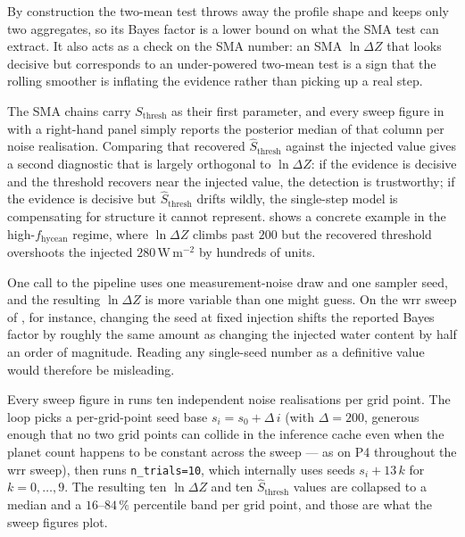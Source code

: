 By construction the two-mean test throws away the profile shape and
keeps only two aggregates, so its Bayes factor is a lower bound on
what the SMA test can extract.  It also acts as a check on the SMA
number: an SMA $\ln\Delta Z$ that looks decisive but corresponds to
an under-powered two-mean test is a sign that the rolling smoother
is inflating the evidence rather than picking up a real step.


\label{ssec:sthresh_recovery}

The SMA chains carry $S_\mathrm{thresh}$ as their first parameter,
and every sweep figure in  with a right-hand
panel simply reports the posterior median of that column per noise
realisation.  Comparing that recovered $\hat{S}_\mathrm{thresh}$
against the injected value gives a second diagnostic that is largely
orthogonal to $\ln\Delta Z$: if the evidence is decisive and the
threshold recovers near the injected value, the detection is
trustworthy; if the evidence is decisive but $\hat{S}_\mathrm{thresh}$
drifts wildly, the single-step model is compensating for structure
it cannot represent.   shows a concrete
example in the high-$f_\mathrm{hycean}$ regime, where $\ln\Delta Z$
climbs past $200$ but the recovered threshold overshoots the
injected $280\,\mathrm{W\,m^{-2}}$ by hundreds of units.


\label{ssec:multi_seed}

One call to the pipeline uses one measurement-noise draw and one
sampler seed, and the resulting $\ln\Delta Z$ is more variable than
one might guess.  On the wrr sweep of , for
instance, changing the seed at fixed injection shifts the reported
Bayes factor by roughly the same amount as changing the injected
water content by half an order of magnitude.  Reading any
single-seed number as a definitive value would therefore be
misleading.

Every sweep figure in  runs ten independent noise
realisations per grid point.  The loop picks a per-grid-point seed
base $s_i = s_0 + \Delta\,i$ (with $\Delta=200$, generous enough
that no two grid points can collide in the inference cache even
when the planet count happens to be constant across the sweep ---
as on P4 throughout the wrr sweep), then runs \texttt{n\_trials=10},
which internally uses seeds $s_i + 13\,k$ for $k = 0,\ldots,9$.  The
resulting ten $\ln\Delta Z$ and ten $\hat{S}_\mathrm{thresh}$ values
are collapsed to a median and a $16$--$84\,\%$ percentile band per
grid point, and those are what the sweep figures plot.

